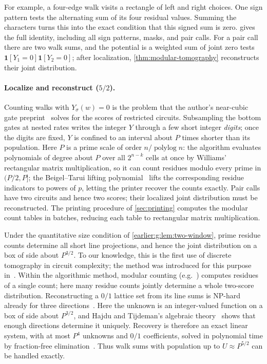 \documentclass[11pt,letterpaper]{article}
\theoremstyle{definition}
\theoremstyle{remark}
\newcommand{\polylog}{\operatorname{polylog}}
\newcommand{\ind}{\mathbf 1}
\begin{document}
For example, a four-edge walk visits a rectangle of left and right
choices. One sign pattern tests the alternating sum of its four
residual values. Summing the characters turns this into the exact
condition that this signed sum is zero.  gives the
full identity, including all sign patterns, masks, and pair calls.
For a pair call there are two walk sums, and the potential is a
weighted sum of joint zero tests \(\ind[Y_1=0]\ind[Y_2=0]\); after
localization, \cref{thm:modular-tomography} reconstructs their joint
distribution.

\paragraph{Localize and reconstruct ($5/2$).}
Counting walks with \(Y_\sigma(w)=0\) is the problem that the
author's near-cubic gate preprint~\cite[Sections~4--6]{NagCG} solves
for the scores of restricted circuits. Subsampling the bottom gates at
nested rates writes the integer \(Y\) through a few short integer
\emph{digits}; once the digits are fixed, \(Y\) is confined to an
interval about \(P\) times shorter than its population. Here \(P\)
is a prime scale of order \(n/\polylog n\): the algorithm evaluates
polynomials of degree about \(P\) over all \(2^{n-k}\) cells at once
by Williams' rectangular matrix multiplication, so it can count
residues modulo every prime in \((P/2,P]\); the Beigel--Tarui lifting polynomial~\cite{BT94} lifts the corresponding residue indicators to powers of \(p\), letting the printer recover the counts exactly. Pair calls have two circuits and hence two scores; their localized
joint distribution must be reconstructed. The printing procedure of
\cref{sec:printing} computes the modular count tables in batches, reducing each table to rectangular matrix multiplication.

Under the quantitative size condition of \cref{earlier:g:lem:two-window},
prime residue counts determine all short line projections, and hence
the joint distribution on a box of side about \(P^{3/2}\).
To our knowledge, this is the first use of discrete tomography in circuit complexity; the method was introduced for this purpose in~\cite{NagCG}.
Within the algorithmic method, modular counting (e.g.~\cite{Wil13,ACW16}) computes residues of a single count; here many residue counts jointly determine a whole two-score distribution.
Reconstructing a \(0/1\) lattice set from its line sums is NP-hard already for three directions~\cite{GGP99}.
Here the unknown is an integer-valued function on a box of side about \(P^{3/2}\), and Hajdu and Tijdeman's algebraic theory~\cite{HT01} shows that enough directions determine it uniquely. Recovery is therefore an exact linear system, with at most \(P^4\) unknowns and \(0/1\) coefficients, solved in polynomial time by fraction-free elimination~\cite{Bareiss68}.
Thus walk sums with population up to \(U\approx P^{5/2}\) can be handled exactly.
\end{document}
